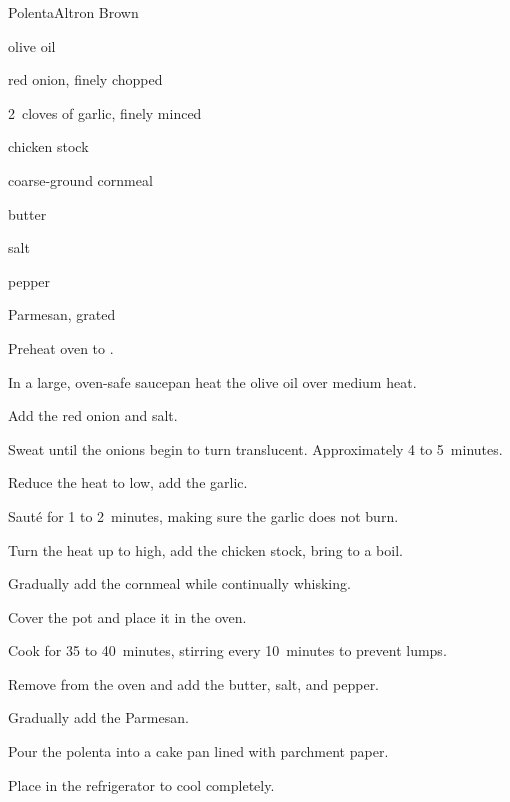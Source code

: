 \begin{recipe}{Polenta}{Altron Brown}{}

\begin{ingredients}
\item {} olive oil
\item \C{\threequarter} red onion, finely chopped
\item 2~cloves of garlic, finely minced
\item {} chicken stock
\item {} coarse-ground cornmeal
\item {} butter
\item \tp{1\half} salt
\item \tp{\quarter} pepper
\item \C{\third} Parmesan, grated
\end{ingredients}

\begin{directions}
\item Preheat oven to .
\item In a large, oven-safe saucepan heat the olive oil over medium heat.
\item Add the red onion and salt.
\item Sweat until the onions begin to turn translucent. Approximately 4 to 5~minutes.
\item Reduce the heat to low, add the garlic.
\item Saut\'e for 1 to 2~minutes, making sure the garlic does not burn.
\item Turn the heat up to high, add the chicken stock, bring to a boil.
\item Gradually add the cornmeal while continually whisking.
\item Cover the pot and place it in the oven.
\item Cook for 35 to 40~minutes, stirring every 10~minutes to prevent lumps.
\item Remove from the oven and add the butter, salt, and pepper.
\item Gradually add the Parmesan.
\item Pour the polenta into a cake pan lined with parchment paper.
\item Place in the refrigerator to cool completely.
\end{directions}
\end{recipe}
